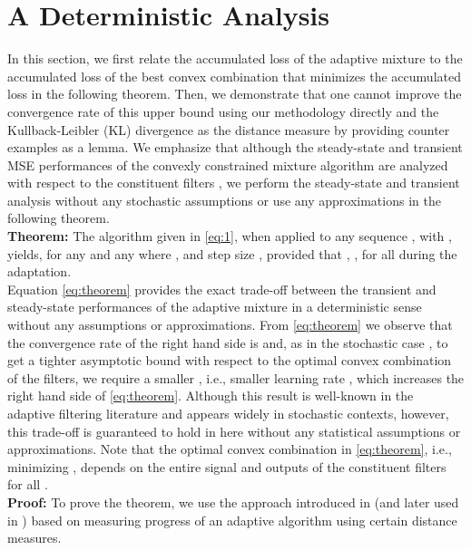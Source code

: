 \documentclass[journal]{IEEEtran}
\begin{document}
\section{A Deterministic Analysis \label{sec:deterministic_analysis}}

In this section, we first relate the accumulated loss of the adaptive
mixture to the accumulated loss of the best convex combination that
minimizes the accumulated loss in the following theorem. Then, we
demonstrate that one cannot improve the convergence rate of this upper
bound using our methodology directly and the Kullback-Leibler (KL)
divergence \cite{KiWa02} as the distance measure by providing counter
examples as a lemma. We emphasize that although the steady-state and
transient MSE performances of the convexly constrained mixture
algorithm are analyzed with respect to the constituent filters
\cite{convex,tranconv,kozat}, we perform the steady-state and
transient analysis without any stochastic assumptions or use any
approximations in the following theorem.\\

\noindent
{\bf Theorem:} The algorithm given in \eqref{eq:1}, when applied to
any sequence , with , yields, for any 
and any 
\normalsize
where ,  and step size , provided that , , for all
 during the adaptation. \\

Equation \eqref{eq:theorem} provides the exact trade-off between the
transient and steady-state performances of the adaptive mixture in a
deterministic sense without any assumptions or approximations.  From
 \eqref{eq:theorem} we observe that the convergence rate of the right hand
side is  and, as in the
stochastic case \cite{kozat}, to get a tighter asymptotic bound with
respect to the optimal convex combination of the filters, we require a
smaller , i.e., smaller learning rate , which increases
the right hand side of \eqref{eq:theorem}.  Although this result is
well-known in the adaptive filtering literature and appears widely in
stochastic contexts, however, this trade-off is guaranteed to hold in
here without any statistical assumptions or approximations.  Note that
the optimal convex combination in \eqref{eq:theorem}, i.e., minimizing ,
depends on the entire signal and outputs of the
constituent filters for all .\\

\noindent
{\bf Proof:} To prove the theorem, we use the approach introduced in
\cite{cesab} (and later used in \cite{KiWa02}) based on
measuring progress of an adaptive algorithm using certain distance
measures.
\end{document}
